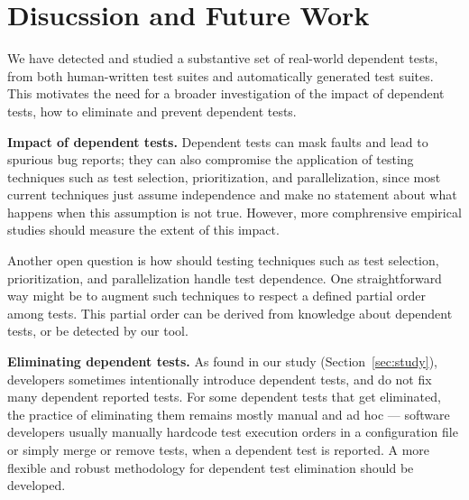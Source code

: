 \section{Disucssion and Future Work}
\label{sec:discussion}



We have detected and studied a substantive set of
real-world dependent tests, from both human-written test suites and
automatically generated test suites. This motivates
the need for a broader
investigation of the impact of dependent tests,
how to eliminate and prevent dependent tests.

\vspace{1mm}

\noindent \textbf{{Impact of dependent tests.}}
Dependent tests can mask faults and lead to
spurious bug reports; they can also 
compromise the application of
testing techniques such as test selection,
prioritization, and parallelization, since
most current techniques just assume independence and
make no statement about what happens when this
assumption is not true. However,
more comphrensive empirical studies should measure  
the extent of this impact.


Another open question is how should
testing techniques such as test
selection, prioritization, and parallelization
handle test dependence.
One straightforward way 
might be to augment such techniques to respect a
defined partial order among tests. This partial order
can be derived from knowledge about dependent tests,
or be detected by our \ourtool tool.



\vspace{1mm}

\noindent \textbf{{Eliminating dependent tests.}}
As found in our study (Section~\ref{sec:study}),
developers sometimes intentionally introduce dependent tests,
and do not fix many dependent reported tests.
For some dependent tests that get eliminated,
the practice of eliminating them
remains mostly manual and ad hoc --- software developers
usually manually hardcode test
execution orders in a configuration file or
simply merge or remove tests, when a dependent test is reported. 
A more flexible and robust methodology for
dependent test elimination should be developed.

